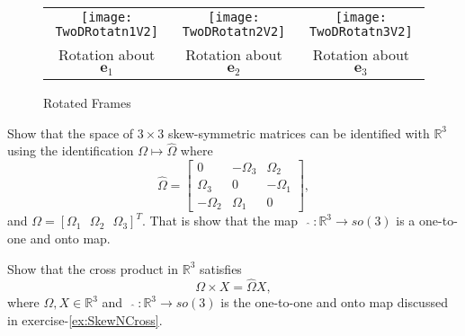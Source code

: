 \documentclass[graybox,envcountchap,sectrefs]{svmonoMuga}
\begin{document}
\begin{exercise}
\begin{figure}[ht]
\begin{center}
\begin{tabular}{ccc}
\texttt{[image: TwoDRotatn1V2]} & \texttt{[image: TwoDRotatn2V2]} & \texttt{[image: TwoDRotatn3V2]}\\
Rotation about $\mathbf{e}_1$ & Rotation about $\mathbf{e}_2$ & Rotation about $\mathbf{e}_3$ 
\end{tabular}
\renewcommand{\baselinestretch}{1}\selectfont
\caption{Rotated Frames}
\label{Fig:TwoDRotatnFrames2}
\renewcommand{\baselinestretch}{1.5}\selectfont
\end{center}
\end{figure}

\end{exercise}

\begin{exercise}\label{ex:SkewNCross}
Show that the space of $3 \times 3$ skew-symmetric matrices can be identified with $\mathbb{R}^3$ using the identification
$\Omega \mapsto \widehat{\Omega}$ where
\begin{equation*}\label{eq:SkewSymmetric1}
\widehat{\Omega}=\left[ \begin{array}{ccc} 0 & -\Omega_3 & \Omega_2 \\ \Omega_3 & 0 & -\Omega_1 \\ -\Omega_2 & \Omega_1 & 0\end{array}\right],
\end{equation*}
and $\Omega =[\Omega_1\:\:\:\Omega_2\:\:\:\Omega_3]^T$. That is show that the map
$\:\:\:\widehat{}\::\mathbb{R}^3\to so(3)$ is a one-to-one and onto map.
\end{exercise}



\begin{exercise}\label{ex:SkewNCross1}
Show that the cross product in $\mathbb{R}^3$ satisfies
\begin{equation*}\label{eq:CrossProduct}
\Omega \times X=\widehat{\Omega}X,
\end{equation*}
where $\Omega,X\in\mathbb{R}^3$ and $\:\:\:\widehat{}\::\mathbb{R}^3\to so(3)$ is the one-to-one and onto map discussed in exercise-\ref{ex:SkewNCross}.
\end{exercise}
\end{document}

